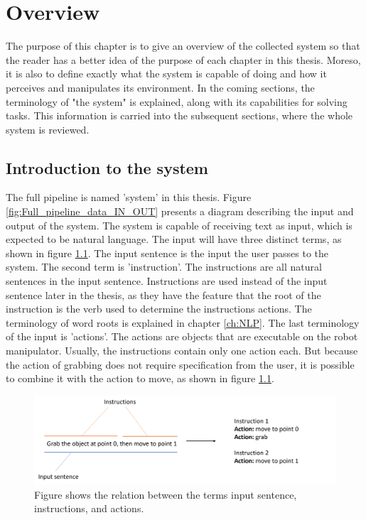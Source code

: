 \chapter{Overview}\label{ch:overview}
The purpose of this chapter is to give an overview of the collected system so that the reader has a better idea of the purpose of each chapter in this thesis. Moreso, it is also to define exactly what the system is capable of doing and how it perceives and manipulates its environment. In the coming sections, the terminology of "the system" is explained, along with its capabilities for solving tasks. This information is carried into the subsequent sections, where the whole system is reviewed.

\section{Introduction to the system}\label{sec:sys_overview_task}
The full pipeline is named 'system' in this thesis. Figure \ref{fig:Full_pipeline_data_IN_OUT} presents a diagram describing the input and output of the system. The system is capable of receiving text as input, which is expected to be natural language. The input will have three distinct terms, as shown in figure \ref{fig:sentence_instruction_action}. The input sentence is the input the user passes to the system. The second term is 'instruction'. The instructions are all natural sentences in the input sentence. Instructions are used instead of the input sentence later in the thesis, as they have the feature that the root of the instruction is the verb used to determine the instructions actions. The terminology of word roots is explained in chapter \ref{ch:NLP}. The last terminology of the input is 'actions'. The actions are objects that are executable on the robot manipulator. Usually, the instructions contain only one action each. But because the action of grabbing does not require specification from the user, it is possible to combine it with the action to move, as shown in figure \ref{fig:sentence_instruction_action}.
\begin{figure}[ht]
    \centering
    \includegraphics[width=13cm]{img/Sentence_instruction_action.png}
    \caption{Figure shows the relation between the terms input sentence, instructions, and actions.}
    \label{fig:sentence_instruction_action}
\end{figure}

